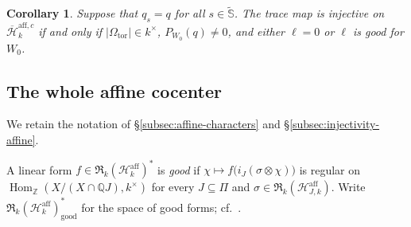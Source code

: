 \documentclass[11pt,letterpaper]{amsart}
\newtheorem{corollary}[theorem]{Corollary}
\theoremstyle{definition}
\numberwithin{equation}{section}
\numberwithin{theorem}{section}
\newcommand{\kk}{k}
\newcommand{\ZZ}{\mathbb Z}
\newcommand{\QQ}{\mathbb Q}
\newcommand{\cH}{\mathcal H}
\newcommand{\bH}{\overline{\mathcal H}}
\newcommand{\cR}{\mathfrak R}
\newcommand{\Saff}{\widetilde{\mathbb S}}
\DeclareMathOperator{\Hom}{Hom}
\begin{document}
\begin{corollary}\label{cor:affine-injectivity-equal}
Suppose that $q_s=q$ for all $s\in\Saff$.
The trace map is injective on
$\bH_\kk^{\mathrm{aff},c}$ if and only if $|\Omega_{\mathrm{tor}}|\in\kk^\times$, $P_{W_0}(q)\ne0$, and either $\ell=0$ or $\ell$ is good for $W_0$.
\end{corollary}

\subsection{The whole affine cocenter}
\label{subsec:injectivity-affine-whole}

We retain the notation of
\S\ref{subsec:affine-characters} and \S\ref{subsec:injectivity-affine}.

A linear form
$f\in\cR_\kk(\cH_\kk^{\mathrm{aff}})^*$
is \emph{good} if $\chi\longmapsto f\bigl(i_J(\sigma\otimes\chi)\bigr)$
is regular on
$\Hom_{\ZZ}(X/(X\cap\QQ J),\kk^\times)$
for every $J\subseteq\Pi$ and
$\sigma\in\cR_\kk(\cH_{J,\kk}^{\mathrm{aff}})$.
Write
$\cR_\kk(\cH_\kk^{\mathrm{aff}})^*_{\mathrm{good}}$
for the space of good forms;
cf.\ \cite[Definition~3.5]{CH}.
\end{document}
